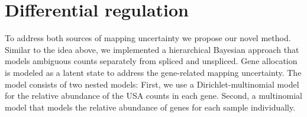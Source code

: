 \section{Differential regulation}
To address both sources of mapping uncertainty we propose our novel method. Similar to the idea above, we implemented a hierarchical Bayesian approach that models ambiguous counts separately from spliced and unspliced. Gene allocation is modeled as a latent state to address the gene-related mapping uncertainty. The model consists of two nested models: First, we use a Dirichlet-multinomial model for the relative abundance of the USA counts in each gene. Second, a multinomial model that models the relative abundance of genes for each sample individually.


